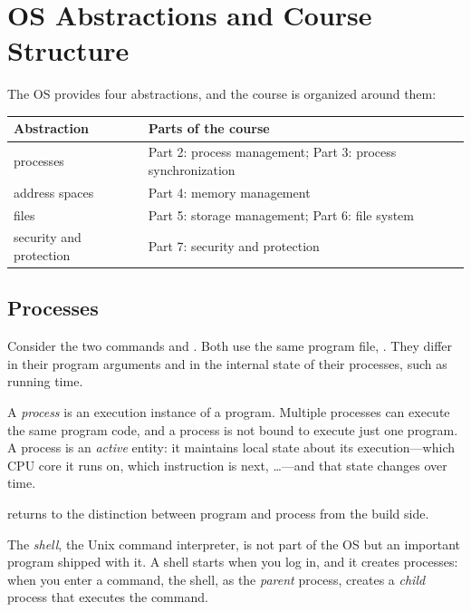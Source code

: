 \section{OS Abstractions and Course Structure}
\label{sec:abstractions}

The OS provides four abstractions, and the course is organized around them:
\begin{center}
\begin{tabular}{ll}
  \toprule
  Abstraction & Parts of the course \\
  \midrule
  processes & Part 2: process management; Part 3: process synchronization \\
  address spaces & Part 4: memory management \\
  files & Part 5: storage management; Part 6: file system \\
  security and protection & Part 7: security and protection \\
  \bottomrule
\end{tabular}
\end{center}

\subsection{Processes}

Consider the two commands  and . Both use the same program file, . They differ in their program arguments and in the internal state of their processes, such as running time.

\begin{definition}[Process]
  A \emph{process} is an execution instance of a program. Multiple processes can execute the same program code, and a process is not bound to execute just one program. A process is an \emph{active} entity: it maintains local state about its execution---which CPU core it runs on, which instruction is next, \dots---and that state changes over time.
\end{definition}

 returns to the distinction between program and process from the build side.

\begin{definition}[Shell]
  The \emph{shell}, the Unix command interpreter, is not part of the OS but an important program shipped with it. A shell starts when you log in, and it creates processes: when you enter a command, the shell, as the \emph{parent} process, creates a \emph{child} process that executes the command.
\end{definition}

